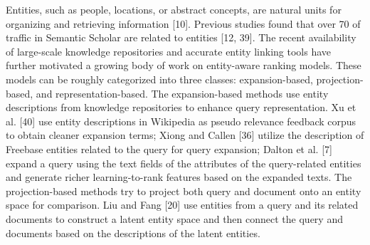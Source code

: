 Entities, such as people, locations, or abstract concepts, are natural units for organizing and retrieving information [10]. Previous
studies found that over 70%
of traffic in Semantic Scholar are related to entities [12, 39]. The
recent availability of large-scale knowledge repositories and accurate entity linking tools have further motivated a growing body of
work on entity-aware ranking models. These models can be roughly
categorized into three classes: expansion-based, projection-based,
and representation-based.
The expansion-based methods use entity descriptions from knowledge repositories to enhance query representation. Xu et al. [40]
use entity descriptions in Wikipedia as pseudo relevance feedback
corpus to obtain cleaner expansion terms; Xiong and Callen [36]
utilize the description of Freebase entities related to the query for
query expansion; Dalton et al. [7] expand a query using the text
fields of the attributes of the query-related entities and generate
richer learning-to-rank features based on the expanded texts.
The projection-based methods try to project both query and document onto an entity space for comparison. Liu and Fang [20] use
entities from a query and its related documents to construct a latent
entity space and then connect the query and documents based on
the descriptions of the latent entities. 
